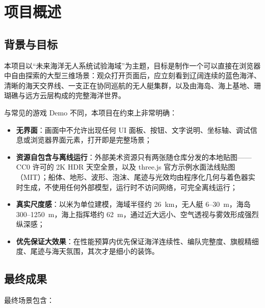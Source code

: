 \documentclass[UTF8, a4paper, 11pt]{ctexart}
\begin{document}
\newpage
\tableofcontents
\newpage

\setcounter{page}{1}

\section{项目概述}

\subsection{背景与目标}

本项目以“未来海洋无人系统试验海域”为主题，目标是制作一个可以直接在浏览器中自由探索的大型三维场景：观众打开页面后，应立刻看到辽阔连续的蓝色海洋、清晰的海天交界线、一支正在协同巡航的无人艇集群，以及由海岛、海上基地、珊瑚礁与远方云层构成的完整海洋世界。

与常见的游戏 Demo 不同，本项目在约束上非常明确：

\begin{itemize}
  \item \textbf{无界面}：画面中不允许出现任何 UI 面板、按钮、文字说明、坐标轴、调试信息或浏览器界面元素，打开即是完整场景；
  \item \textbf{资源自包含与离线运行}：外部美术资源只有两张随仓库分发的本地贴图——CC0 许可的 2K HDR 天空全景，以及 three.js 官方示例水面法线贴图（MIT）；船体、地形、波形、泡沫、尾迹与光效均由程序化几何与着色器实时生成，不使用任何外部模型，运行时不访问网络，可完全离线运行；
  \item \textbf{真实尺度感}：以米为单位建模，海域半径约 26~km，无人艇 6--30~m，海岛 300--1250~m，海上指挥塔约 62~m，通过近大远小、空气透视与雾效形成强烈纵深感；
  \item \textbf{优先保证大效果}：在性能预算内优先保证海洋连续性、编队完整度、旗舰精细度、尾迹与海天氛围，其次才是细小的装饰。
\end{itemize}

\subsection{最终成果}

最终场景包含：
\end{document}
